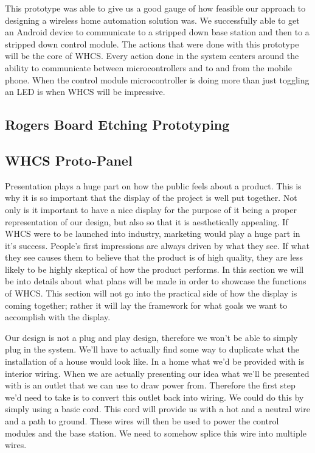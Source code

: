 This prototype was able to give us a good gauge of how feasible
our approach to designing a wireless home automation solution was. We
successfully able to get an Android device to communicate to a stripped down
base station and then to a stripped down control module. The actions that were
done with this prototype will be the core of WHCS. Every action done in the
system centers around the ability to communicate between microcontrollers and
to and from the mobile phone.  When the control module microcontroller is doing
more than just toggling an LED is when WHCS will be impressive.

\subsection{Rogers Board Etching Prototyping}

\subsection{WHCS Proto-Panel}
\label{sec:proto-panel-proto}
Presentation plays a huge part on how the public feels about a product. This is
why it is so important that the display of the project is well put together.
Not only is it important to have a nice display for the purpose of it being a
proper representation of our design, but also so that it is aesthetically
appealing. If WHCS were to be launched into industry, marketing would play a
huge part in it{}'s success. People{}'s first impressions are always driven by
what they see. If what they see causes them to believe that the product is of
high quality, they are less likely to be highly skeptical of how the product
performs. In this section we will be into details about what plans will be made
in order to showcase the functions of WHCS. This section will not go into the
practical side of how the display is coming together; rather it will lay the framework for what goals we want to
accomplish with the display.

Our design is not a plug and play design, therefore we won{}'t
be able to simply plug in the system. We{}'ll have to actually find some way to
duplicate what the installation of a house would look like. In a home what
we{}'d be provided with is interior wiring. When we are actually presenting our
idea what we{}'ll be presented with is an outlet that we can use to draw power
from. Therefore the first step we{}'d need to take is to convert this outlet
back into wiring. We could do this by simply using a basic cord. This cord will
provide us with a hot and a neutral wire and a path to ground. These wires will
then be used to power the control modules and the base station. We need to
somehow splice this wire into multiple wires.


